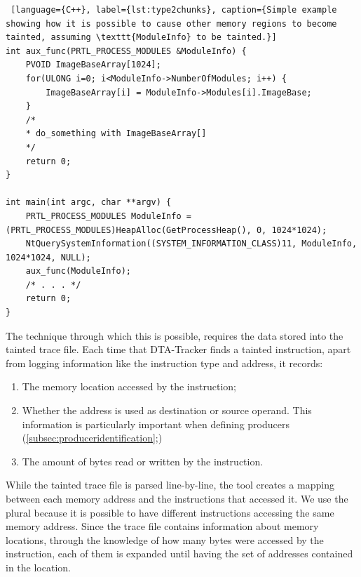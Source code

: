 \documentclass[LaM,binding=0.6cm]{sapthesis}
\begin{document}
\begin{lstlisting} [language={C++}, label={lst:type2chunks}, caption={Simple example showing how it is possible to cause other memory regions to become tainted, assuming \texttt{ModuleInfo} to be tainted.}]
int aux_func(PRTL_PROCESS_MODULES &ModuleInfo) {
	PVOID ImageBaseArray[1024];
	for(ULONG i=0; i<ModuleInfo->NumberOfModules; i++) {
		ImageBaseArray[i] = ModuleInfo->Modules[i].ImageBase;
	}
	/*
	* do_something with ImageBaseArray[]
	*/
	return 0;
}

int main(int argc, char **argv) {
	PRTL_PROCESS_MODULES ModuleInfo = (PRTL_PROCESS_MODULES)HeapAlloc(GetProcessHeap(), 0, 1024*1024);
	NtQuerySystemInformation((SYSTEM_INFORMATION_CLASS)11, ModuleInfo, 1024*1024, NULL);
	aux_func(ModuleInfo);
	/* . . . */
	return 0;
}

\end{lstlisting}

The technique through which this is possible, requires the data stored into the tainted trace file. Each time that DTA-Tracker finds a tainted instruction, apart from logging information like the instruction type and address, it records:
\begin{enumerate}
\item The memory location accessed by the instruction;
\item Whether the address is used as destination or source operand. This information is particularly important when defining producers (\autoref{subsec:produceridentification};)
\item The amount of bytes read or written by the instruction.
\end{enumerate}
While the tainted trace file is parsed line-by-line, the tool creates a mapping between each memory address and the instructions that accessed it. We use the plural because it is possible to have different instructions accessing the same memory address. Since the trace file contains information about memory locations, through the knowledge of how many bytes were accessed by the instruction, each of them is expanded until having the set of addresses contained in the location.\\
\end{document}
